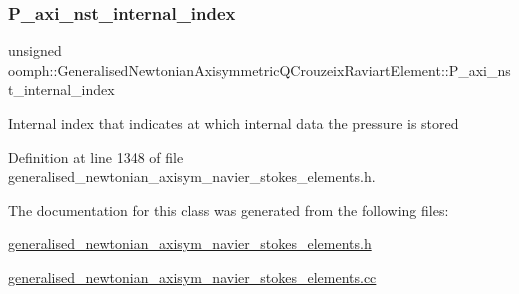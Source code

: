 \subsubsection{\texorpdfstring{P\+\_\+axi\+\_\+nst\+\_\+internal\+\_\+index}{P\_axi\_nst\_internal\_index}}
{\footnotesize\ttfamily unsigned oomph\+::\+Generalised\+Newtonian\+Axisymmetric\+Q\+Crouzeix\+Raviart\+Element\+::\+P\+\_\+axi\+\_\+nst\+\_\+internal\+\_\+index\hspace{0.3cm}{\ttfamily [protected]}}

Internal index that indicates at which internal data the pressure is stored 

Definition at line 1348 of file generalised\+\_\+newtonian\+\_\+axisym\+\_\+navier\+\_\+stokes\+\_\+elements.\+h.



The documentation for this class was generated from the following files\+:\begin{DoxyCompactItemize}
\item 
\hyperlink{generalised__newtonian__axisym__navier__stokes__elements_8h}{generalised\+\_\+newtonian\+\_\+axisym\+\_\+navier\+\_\+stokes\+\_\+elements.\+h}\item 
\hyperlink{generalised__newtonian__axisym__navier__stokes__elements_8cc}{generalised\+\_\+newtonian\+\_\+axisym\+\_\+navier\+\_\+stokes\+\_\+elements.\+cc}\end{DoxyCompactItemize}
